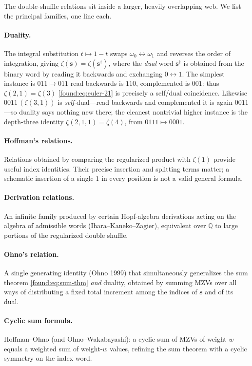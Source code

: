 The double-shuffle relations sit inside a larger, heavily overlapping web. We list the principal families, one line each.

\paragraph{Duality.} The integral substitution $t\mapsto1-t$ swaps $\omega_0\leftrightarrow\omega_1$ and reverses the order of integration, giving $\zeta(\mathbf{s})=\zeta(\mathbf{s}^\dagger)$, where the \emph{dual} word $\mathbf{s}^\dagger$ is obtained from the binary word by reading it backwards and exchanging $0\leftrightarrow1$. The simplest instance is $011\mapsto011$ read backwards is $110$, complemented is $001$: thus $\zeta(2,1)=\zeta(3)$ \eqref{found:eq:euler-21} is precisely a self/dual coincidence. Likewise $0011\,(\zeta(3,1))$ is \emph{self}-dual---read backwards and complemented it is again $0011$---so duality says nothing new there; the cleanest nontrivial higher instance is the depth-three identity $\zeta(2,1,1)=\zeta(4)$, from $0111\mapsto0001$.

\paragraph{Hoffman's relations.} Relations obtained by comparing the
regularized product with $\zeta(1)$ provide useful index identities. Their
precise insertion and splitting terms matter; a schematic insertion of a
single $1$ in every position is not a valid general formula.

\paragraph{Derivation relations.} An infinite family produced by certain Hopf-algebra derivations acting on the algebra of admissible words (Ihara--Kaneko--Zagier), equivalent over $\mathbb{Q}$ to large portions of the regularized double shuffle.

\paragraph{Ohno's relation.} A single generating identity (Ohno 1999) that simultaneously generalizes the sum theorem \eqref{found:eq:sum-thm} \emph{and} duality, obtained by summing MZVs over all ways of distributing a fixed total increment among the indices of $\mathbf{s}$ and of its dual.

\paragraph{Cyclic sum formula.} Hoffman--Ohno (and Ohno--Wakabayashi): a cyclic sum of MZVs of weight $w$ equals a weighted sum of weight-$w$ values, refining the sum theorem with a cyclic symmetry on the index word.

